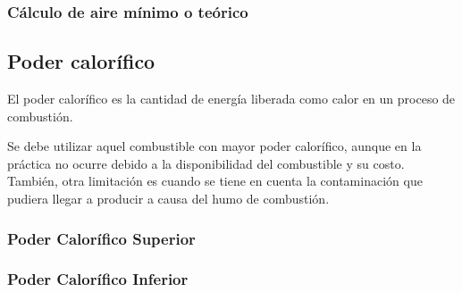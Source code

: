\subsubsection{Cálculo de aire mínimo o teórico}

\subsection{Poder calorífico}
El poder calorífico es la cantidad de energía liberada como calor en un proceso de combustión.

Se debe utilizar aquel combustible con mayor poder calorífico, aunque en la práctica no ocurre debido a la disponibilidad del combustible y su costo. También, otra limitación es cuando se tiene en cuenta la contaminación que pudiera llegar a producir a causa del humo de combustión.
	

\subsubsection{Poder Calorífico Superior}

\subsubsection{Poder Calorífico Inferior}